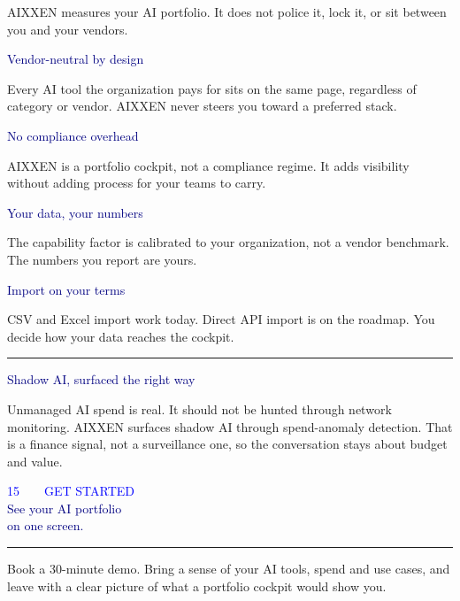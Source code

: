 \documentclass[10pt]{article}
\newcommand{\bodysize}{\fontsize{9.6}{15.2}\selectfont}
\newcommand{\sectionhead}[3]{%
  {\semibold\fontsize{8}{8}\selectfont\textcolor{blue}{#1\ \ \textbullet\ \ \MakeUppercase{#2}}}\\[5pt]
  {\black\fontsize{25}{28}\selectfont\textcolor{navy}{#3}}\\[6pt]
  {\color{blue}\rule{40pt}{2.8pt}}\par\vspace{14pt}}
\newcommand{\body}[1]{{\bodysize\textcolor{ink}{#1}\par}}
\newcommand{\lead}[1]{{\medium\fontsize{11.5}{16}\selectfont\textcolor{slate}{#1}\par}}
\newcommand{\cardtitle}[1]{{\heavy\fontsize{10.5}{12}\selectfont\textcolor{navy}{#1}\par\vspace{3pt}}}
\begin{document}
\lead{AIXXEN measures your AI portfolio. It does not police it, lock it, or sit between you and your vendors.}
\vspace{18pt}

\newcommand{\trust}[2]{%
\begin{tile}
\cardtitle{#1}
{\fontsize{8.6}{12.2}\selectfont\textcolor{slate}{#2}}
\end{tile}}

\begin{minipage}[t]{0.485\textwidth}
\trust{Vendor-neutral by design}{Every AI tool the organization pays for sits on the same page, regardless of category or vendor. AIXXEN never steers you toward a preferred stack.}
\vspace{10pt}
\trust{No compliance overhead}{AIXXEN is a portfolio cockpit, not a compliance regime. It adds visibility without adding process for your teams to carry.}
\end{minipage}\hfill
\begin{minipage}[t]{0.485\textwidth}
\trust{Your data, your numbers}{The capability factor is calibrated to your organization, not a vendor benchmark. The numbers you report are yours.}
\vspace{10pt}
\trust{Import on your terms}{CSV and Excel import work today. Direct API import is on the roadmap. You decide how your data reaches the cockpit.}
\end{minipage}

\vspace{20pt}
{\color{linegray}\rule{\textwidth}{0.7pt}}
\vspace{14pt}

{\heavy\fontsize{12}{15}\selectfont\textcolor{navy}{Shadow AI, surfaced the right way}}\par
\vspace{8pt}
\body{Unmanaged AI spend is real. It should not be hunted through network monitoring. AIXXEN surfaces shadow AI through spend-anomaly detection. That is a finance signal, not a surveillance one, so the conversation stays about budget and value.}
\newpage

\sectionhead{15}{Get Started}{See your AI portfolio\\on one screen.}

\lead{Book a 30-minute demo. Bring a sense of your AI tools, spend and use cases, and leave with a clear picture of what a portfolio cockpit would show you.}
\vspace{20pt}
\end{document}

